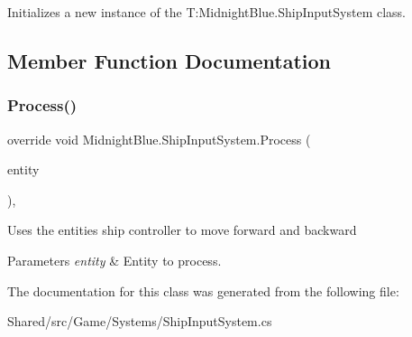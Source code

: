 Initializes a new instance of the T\+:\+Midnight\+Blue.\+Ship\+Input\+System class. 



\subsection{Member Function Documentation}
\hypertarget{class_midnight_blue_1_1_ship_input_system_ac504beb5b6afa47ca4618d9683e46946}{}\label{class_midnight_blue_1_1_ship_input_system_ac504beb5b6afa47ca4618d9683e46946} 
\subsubsection{\texorpdfstring{Process()}{Process()}}
{\footnotesize\ttfamily override void Midnight\+Blue.\+Ship\+Input\+System.\+Process (\begin{DoxyParamCaption}\item[{Entity}]{entity }\end{DoxyParamCaption})\hspace{0.3cm}{\ttfamily [inline]}, {\ttfamily [protected]}}



Uses the entities ship controller to move forward and backward 


\begin{DoxyParams}{Parameters}
{\em entity} & Entity to process.\\
\hline
\end{DoxyParams}


The documentation for this class was generated from the following file\+:\begin{DoxyCompactItemize}
\item 
Shared/src/\+Game/\+Systems/Ship\+Input\+System.\+cs\end{DoxyCompactItemize}
